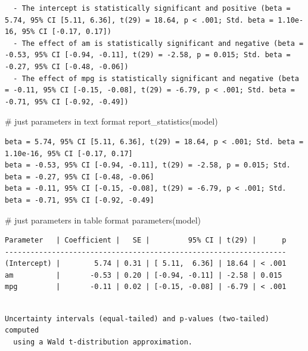 \documentclass[
  letterpaper,
  DIV=11,
  numbers=noendperiod]{scrreprt}
\newenvironment{Shaded}{\begin{snugshade}}{\end{snugshade}}
\newcommand{\CommentTok}[1]{\textcolor[rgb]{0.37,0.37,0.37}{#1}}
\newcommand{\FunctionTok}[1]{\textcolor[rgb]{0.28,0.35,0.67}{#1}}
\newcommand{\NormalTok}[1]{\textcolor[rgb]{0.00,0.23,0.31}{#1}}
\begin{document}
\begin{verbatim}
  - The intercept is statistically significant and positive (beta = 5.74, 95% CI [5.11, 6.36], t(29) = 18.64, p < .001; Std. beta = 1.10e-16, 95% CI [-0.17, 0.17])
  - The effect of am is statistically significant and negative (beta = -0.53, 95% CI [-0.94, -0.11], t(29) = -2.58, p = 0.015; Std. beta = -0.27, 95% CI [-0.48, -0.06])
  - The effect of mpg is statistically significant and negative (beta = -0.11, 95% CI [-0.15, -0.08], t(29) = -6.79, p < .001; Std. beta = -0.71, 95% CI [-0.92, -0.49])
\end{verbatim}

\begin{Shaded}
\begin{Highlighting}[]
\CommentTok{\# just parameters in text format}
\FunctionTok{report\_statistics}\NormalTok{(model)}
\end{Highlighting}
\end{Shaded}

\begin{verbatim}
beta = 5.74, 95% CI [5.11, 6.36], t(29) = 18.64, p < .001; Std. beta = 1.10e-16, 95% CI [-0.17, 0.17]
beta = -0.53, 95% CI [-0.94, -0.11], t(29) = -2.58, p = 0.015; Std. beta = -0.27, 95% CI [-0.48, -0.06]
beta = -0.11, 95% CI [-0.15, -0.08], t(29) = -6.79, p < .001; Std. beta = -0.71, 95% CI [-0.92, -0.49]
\end{verbatim}

\begin{Shaded}
\begin{Highlighting}[]
\CommentTok{\# just parameters in table format}
\FunctionTok{parameters}\NormalTok{(model)}
\end{Highlighting}
\end{Shaded}

\begin{verbatim}
Parameter   | Coefficient |   SE |         95% CI | t(29) |      p
------------------------------------------------------------------
(Intercept) |        5.74 | 0.31 | [ 5.11,  6.36] | 18.64 | < .001
am          |       -0.53 | 0.20 | [-0.94, -0.11] | -2.58 | 0.015 
mpg         |       -0.11 | 0.02 | [-0.15, -0.08] | -6.79 | < .001
\end{verbatim}

\begin{verbatim}

Uncertainty intervals (equal-tailed) and p-values (two-tailed) computed
  using a Wald t-distribution approximation.
\end{verbatim}
\end{document}
